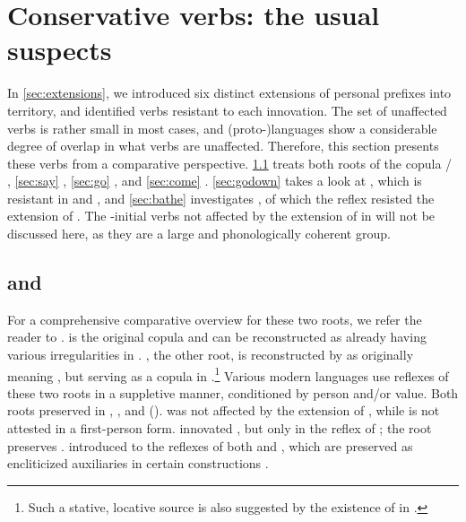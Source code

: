 \section{Conservative verbs: the usual suspects}
\label{sec:verbs}
In \cref{sec:extensions}, we introduced six distinct extensions of personal prefixes into  territory, and identified verbs resistant to each innovation.
The set of unaffected verbs is rather small in most cases, and (proto-)languages show a considerable degree of overlap in what verbs are unaffected.
Therefore, this section presents these verbs from a comparative perspective.
\cref{sec:be} treats both roots of the copula / , \cref{sec:say}  , \cref{sec:go}  , and \cref{sec:come}  .
\cref{sec:godown} takes a look at  , which is resistant in \PTir and \PPek, and  \cref{sec:bathe} investigates  , of which the \PPek reflex  resisted the extension of .
The -initial verbs not affected by the extension of  in \akuriyo {} will not be discussed here, as they are a large and phonologically coherent group.

\subsection{ and  }
\label{sec:be}
For a comprehensive comparative overview for these two roots, we refer the reader to \textcite[375--382]{gildea2018reconstructing}.
 is the original copula and can be reconstructed as already having various irregularities in \PC.
, the other root, is reconstructed by \textcites{meira2009property}{gildea2018reconstructing} as originally meaning , but serving as a copula in \PC.\footnote{Such a stative, locative source is also suggested by the existence of   in \arara \parencite[196]{alves2017arara}.}
Various modern languages use reflexes of these two roots in a suppletive manner, conditioned by person and\slash{}or  value.
Both roots preserved   in \PPek, \PWai, and \PTir ().
\akuriyo {} was not affected by the extension of  , while  is not attested in a first-person form. 
\carijo innovated , but only in the reflex of  ; the  root preserves  .
\yukpa introduced  to the reflexes of both  and , which are preserved as encliticized auxiliaries in certain constructions .

